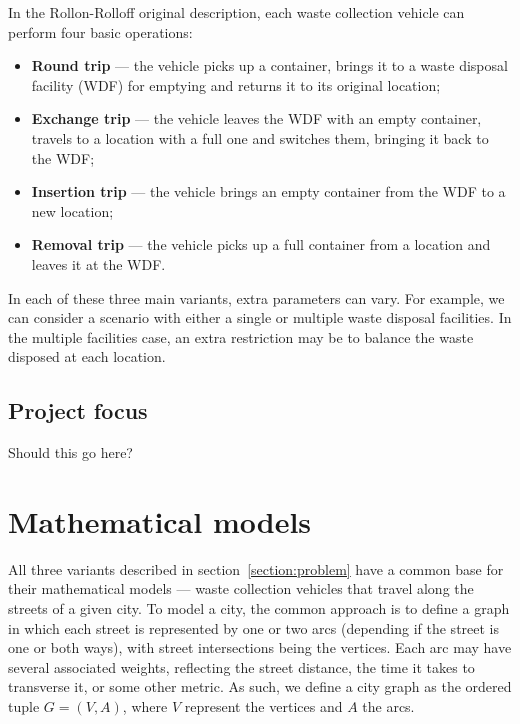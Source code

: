 In the Rollon-Rolloff original description, each waste collection vehicle can
perform four basic operations:

\begin{itemize}
\item \textbf{Round trip} --- the vehicle picks up a container, brings it to a
waste disposal facility (WDF) for emptying and returns it to its original
location;

\item \textbf{Exchange trip} --- the vehicle leaves the WDF with an empty
container, travels to a location with a full one and switches them, bringing it
back to the WDF;

\item \textbf{Insertion trip} --- the vehicle brings an empty container from
the WDF to a new location;

\item \textbf{Removal trip} --- the vehicle picks up a full container from a
location and leaves it at the WDF.
\end{itemize}

In each of these three main variants, extra parameters can vary. For example,
we can consider a scenario with either a single or multiple waste disposal
facilities. In the multiple facilities case, an extra restriction may be to
balance the waste disposed at each location.

\subsection{Project focus}

Should this go here?

\section{Mathematical models}
\label{section:math}

All three variants described in section~\ref{section:problem} have a common
base for their mathematical models --- waste collection vehicles that travel
along the streets of a given city. To model a city, the common approach is to
define a graph in which each street is represented by one or two arcs
(depending if the street is one or both ways), with street intersections being
the vertices. Each arc may have several associated weights, reflecting the
street distance, the time it takes to transverse it, or some other metric. As
such, we define a city graph as the ordered tuple $G = (V, A)$, where $V$
represent the vertices and $A$ the arcs.

